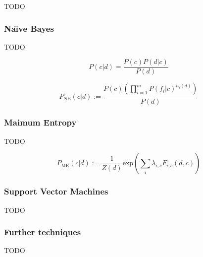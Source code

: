 TODO

\subsubsection*{Na\"{\i}ve Bayes}

TODO

\begin{equation*}
P(c \vert d) = \frac{P(c)P(d \vert c)}{P(d)}
\end{equation*}

\begin{equation*}
P_{\mathrm{NB}}(c \vert d) := \frac{P(c)(\prod^{m}_{i=1}P(f_i \vert c)^{n_i(d)})}{P(d)}
\end{equation*}

\subsubsection*{Maimum Entropy}

TODO

\begin{equation*}
P_{\mathrm{ME}}(c \vert d) := \frac{1}{Z(d)}\mathrm{exp}\left( \sum_{i} \lambda_{i,c} F_{i,c}(d,c) \right)
\end{equation*}

\subsubsection*{Support Vector Machines}

TODO

\subsubsection*{Further techniques}

TODO